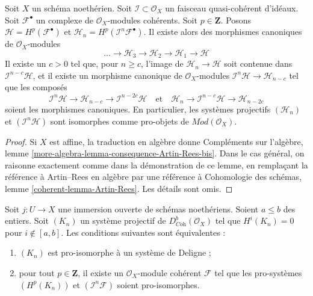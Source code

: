 \begin{lemma}
\label{lemma-consequence-Artin-Rees-bis}
Soit $X$ un schéma noethérien. Soit $\mathcal{I} \subset \mathcal{O}_X$ un faisceau quasi-cohérent d'idéaux. Soit $\mathcal{F}^\bullet$ un complexe de $\mathcal{O}_X$-modules cohérents. Soit $p \in \mathbf{Z}$. Posons $\mathcal{H} = H^p(\mathcal{F}^\bullet)$ et $\mathcal{H}_n = H^p(\mathcal{I}^n\mathcal{F}^\bullet)$. Il existe alors des morphismes canoniques de $\mathcal{O}_X$-modules
$$
\ldots \to \mathcal{H}_3 \to \mathcal{H}_2 \to \mathcal{H}_1 \to \mathcal{H}
$$
Il existe un $c > 0$ tel que, pour $n \geq c$, l'image de $\mathcal{H}_n \to \mathcal{H}$ soit contenue dans $\mathcal{I}^{n - c}\mathcal{H}$, et il existe un morphisme canonique de $\mathcal{O}_X$-modules $\mathcal{I}^n\mathcal{H} \to \mathcal{H}_{n - c}$ tel que les composés
$$
\mathcal{I}^n \mathcal{H} \to \mathcal{H}_{n - c} \to
\mathcal{I}^{n - 2c}\mathcal{H}
\quad\text{et}\quad
\mathcal{H}_n \to \mathcal{I}^{n - c}\mathcal{H} \to \mathcal{H}_{n - 2c}
$$
soient les morphismes canoniques. En particulier, les systèmes projectifs $(\mathcal{H}_n)$ et $(\mathcal{I}^n\mathcal{H})$ sont isomorphes comme pro-objets de $\textit{Mod}(\mathcal{O}_X)$.
\end{lemma}

\begin{proof}
Si $X$ est affine, la traduction en algèbre donne Compléments sur l'algèbre, lemme \ref{more-algebra-lemma-consequence-Artin-Rees-bis}. Dans le cas général, on raisonne exactement comme dans la démonstration de ce lemme, en remplaçant la référence à Artin–Rees en algèbre par une référence à Cohomologie des schémas, lemme \ref{coherent-lemma-Artin-Rees}. Les détails sont omis.
\end{proof}

\begin{lemma}
\label{lemma-characterize-extension-by-zero-algebra}
Soit $j : U \to X$ une immersion ouverte de schémas noethériens. Soient $a \leq b$ des entiers. Soit $(K_n)$ un système projectif de $D^b_{\textit{Coh}}(\mathcal{O}_X)$ tel que $H^i(K_n) = 0$ pour $i \not \in [a, b]$. Les conditions suivantes sont équivalentes :
\begin{enumerate}
\item $(K_n)$ est pro-isomorphe à un système de Deligne ;
\item pour tout $p \in \mathbf{Z}$, il existe un $\mathcal{O}_X$-module cohérent $\mathcal{F}$ tel que les pro-systèmes $(H^p(K_n))$ et $(\mathcal{I}^n\mathcal{F})$ soient pro-isomorphes.
\end{enumerate}
\end{lemma}

